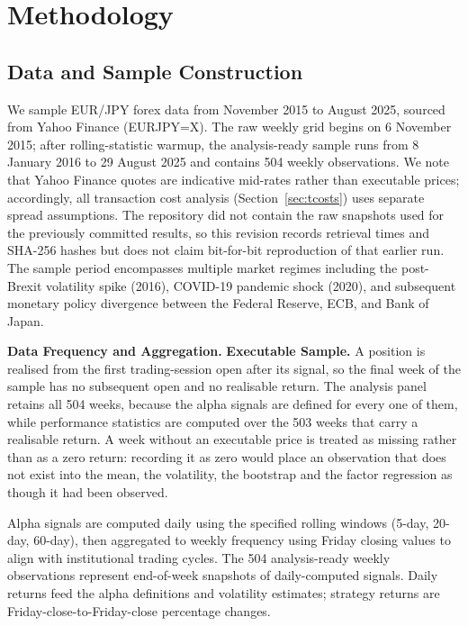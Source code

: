 \documentclass[11pt]{article}
\begin{document}
\section{Methodology}

\subsection{Data and Sample Construction}

We sample EUR/JPY forex data from November 2015 to August 2025, sourced from Yahoo Finance (EURJPY=X). The raw weekly grid begins on 6 November 2015; after rolling-statistic warmup, the analysis-ready sample runs from 8 January 2016 to 29 August 2025 and contains 504 weekly observations. We note that Yahoo Finance quotes are indicative mid-rates rather than executable prices; accordingly, all transaction cost analysis (Section~\ref{sec:tcosts}) uses separate spread assumptions. The repository did not contain the raw snapshots used for the previously committed results, so this revision records retrieval times and SHA-256 hashes but does not claim bit-for-bit reproduction of that earlier run. The sample period encompasses multiple market regimes including the post-Brexit volatility spike (2016), COVID-19 pandemic shock (2020), and subsequent monetary policy divergence between the Federal Reserve, ECB, and Bank of Japan.

\textbf{Data Frequency and Aggregation.} \textbf{Executable Sample.} A position is realised from the first trading-session open after its signal, so the final week of the sample has no subsequent open and no realisable return. The analysis panel retains all 504 weeks, because the alpha signals are defined for every one of them, while performance statistics are computed over the 503 weeks that carry a realisable return. A week without an executable price is treated as missing rather than as a zero return: recording it as zero would place an observation that does not exist into the mean, the volatility, the bootstrap and the factor regression as though it had been observed.

Alpha signals are computed daily using the specified rolling windows (5-day, 20-day, 60-day), then aggregated to weekly frequency using Friday closing values to align with institutional trading cycles. The 504 analysis-ready weekly observations represent end-of-week snapshots of daily-computed signals. Daily returns feed the alpha definitions and volatility estimates; strategy returns are Friday-close-to-Friday-close percentage changes.
\end{document}
